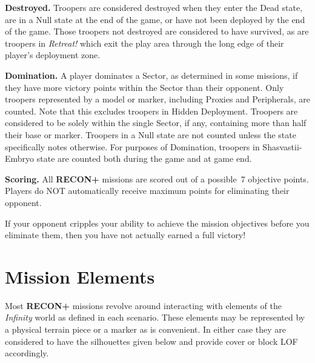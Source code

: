 \documentclass[14pt,dvipsnames]{extarticle}
\newcommand{\missionrule}[1]{\noindent\textbf{#1}\xspace}
\newcommand{\reconplus}{\textbf{RECON+}\xspace}
\begin{document}
\missionrule{Destroyed.} Troopers are considered destroyed when they
enter the Dead state, are in a Null state at the end of the game, or
have not been deployed by the end of the game.  Those troopers not
destroyed are considered to have survived, as are troopers in
\emph{Retreat!} which exit the play area through the long edge of
their player's deployment zone.

\missionrule{Domination.}  A player dominates a Sector, as determined
in some missions, if they have more victory points within the Sector
than their opponent.  Only troopers represented by a model or marker,
including Proxies and Peripherals, are counted.  Note that this
excludes troopers in Hidden Deployment.  Troopers are considered to be
solely within the single Sector, if any, containing more than half
their base or marker.  Troopers in a Null state are not counted unless
the state specifically notes otherwise.  For purposes of Domination,
troopers in Shasvastii-Embryo state are counted both during the game
and at game end.

\missionrule{Scoring.}  All \reconplus missions are scored out of a
possible~7 objective points.  Players do NOT automatically receive
maximum points for eliminating their opponent.

\begin{recon}
  If your opponent cripples your ability to achieve the mission
  objectives before you eliminate them, then you have not actually
  earned a full victory!
\end{recon}

\section{Mission Elements}

Most \reconplus missions revolve around interacting with elements of
the \emph{Infinity} world as defined in each scenario.  These elements
may be represented by a physical terrain piece or a marker as is
convenient.  In either case they are considered to have the
silhouettes given below and provide cover or block LOF accordingly.


\end{document}
